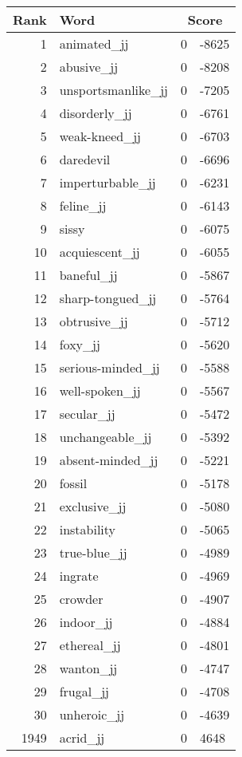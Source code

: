 \begin{longtable}[!htbp]{| rlr@{.}l |}
    \hline
    \textbf{Rank} & \textbf{Word} & \multicolumn{2}{c|}{\textbf{Score}} \\
    \hline
    \endhead
    1 & animated\_jj & 0 & -8625 \\
    2 & abusive\_jj & 0 & -8208 \\
    3 & unsportsmanlike\_jj & 0 & -7205 \\
    4 & disorderly\_jj & 0 & -6761 \\
    5 & weak-kneed\_jj & 0 & -6703 \\
    6 & daredevil & 0 & -6696 \\
    7 & imperturbable\_jj & 0 & -6231 \\
    8 & feline\_jj & 0 & -6143 \\
    9 & sissy & 0 & -6075 \\
    10 & acquiescent\_jj & 0 & -6055 \\
    11 & baneful\_jj & 0 & -5867 \\
    12 & sharp-tongued\_jj & 0 & -5764 \\
    13 & obtrusive\_jj & 0 & -5712 \\
    14 & foxy\_jj & 0 & -5620 \\
    15 & serious-minded\_jj & 0 & -5588 \\
    16 & well-spoken\_jj & 0 & -5567 \\
    17 & secular\_jj & 0 & -5472 \\
    18 & unchangeable\_jj & 0 & -5392 \\
    19 & absent-minded\_jj & 0 & -5221 \\
    20 & fossil & 0 & -5178 \\
    21 & exclusive\_jj & 0 & -5080 \\
    22 & instability & 0 & -5065 \\
    23 & true-blue\_jj & 0 & -4989 \\
    24 & ingrate & 0 & -4969 \\
    25 & crowder & 0 & -4907 \\
    26 & indoor\_jj & 0 & -4884 \\
    27 & ethereal\_jj & 0 & -4801 \\
    28 & wanton\_jj & 0 & -4747 \\
    29 & frugal\_jj & 0 & -4708 \\
    30 & unheroic\_jj & 0 & -4639 \\
    1949 & acrid\_jj & 0 & 4648 \\

\end{longtable}
